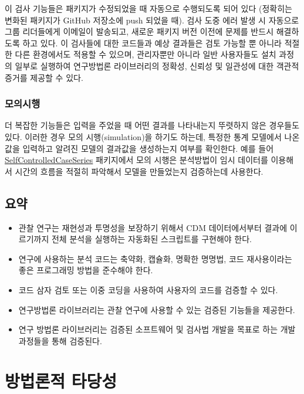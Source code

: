 \documentclass[10.5pt]{book}
\theoremstyle{definition}
\theoremstyle{definition}
\theoremstyle{definition}
\theoremstyle{remark}
\let\BeginKnitrBlock\begin \let\EndKnitrBlock\end
\begin{document}
이 검사 기능들은 패키지가 수정되었을 때 자동으로 수행되도록 되어 있다
(정확히는 변화된 패키지가 GitHub 저장소에 push 되었을 때). 검사 도중
에러 발생 시 자동으로 그룹 리더들에게 이메일이 발송되고, 새로운 패키지
버전 이전에 문제를 반드시 해결하도록 하고 있다. 이 검사들에 대한
코드들과 예상 결과들은 검토 가능할 뿐 아니라 적절한 다른 환경에서도
적용할 수 있으며, 관리자뿐만 아니라 일반 사용자들도 설치 과정의 일부로
실행하여 연구방법론 라이브러리의 정확성, 신뢰성 및 일관성에 대한 객관적
증거를 제공할 수 있다.

\subsection{모의시행}

더 복잡한 기능들은 입력을 주었을 때 어떤 결과를 나타내는지 뚜렷하지 않은
경우들도 있다. 이러한 경우 모의 시행(simulation)을 하기도 하는데, 특정한
통계 모델에서 나온 값을 입력하고 알려진 모델의 결과값을 생성하는지
여부를 확인한다. 예를 들어
\href{https://ohdsi.github.io/SelfControlledCaseSeries/}{SelfControlledCaseSeries}
패키지에서 모의 시행은 분석방법이 임시 데이터를 이용해서 시간의 흐름을
적절히 파악해서 모델을 만들었는지 검증하는데 사용한다.

\section{요약}\label{-15}

\BeginKnitrBlock{rmdsummary}
\begin{itemize}
\item
  관찰 연구는 재현성과 투명성을 보장하기 위해서 CDM 데이터에서부터
  결과에 이르기까지 전체 분석을 실행하는 자동화된 스크립트를 구현해야
  한다.
\item
  연구에 사용하는 분석 코드는 축약화, 캡슐화, 명확한 명명법, 코드
  재사용이라는 좋은 프로그래밍 방법을 준수해야 한다.
\item
  코드 삼자 검토 또는 이중 코딩을 사용하여 사용자의 코드를 검증할 수
  있다.
\item
  연구방법론 라이브러리는 관찰 연구에 사용할 수 있는 검증된 기능들을
  제공한다.
\item
  연구 방법론 라이브러리는 검증된 소프트웨어 및 검사법 개발을 목표로
  하는 개발 과정들을 통해 검증된다.
\end{itemize}
\EndKnitrBlock{rmdsummary}

\chapter{방법론적 타당성}\label{MethodValidity}
\end{document}
